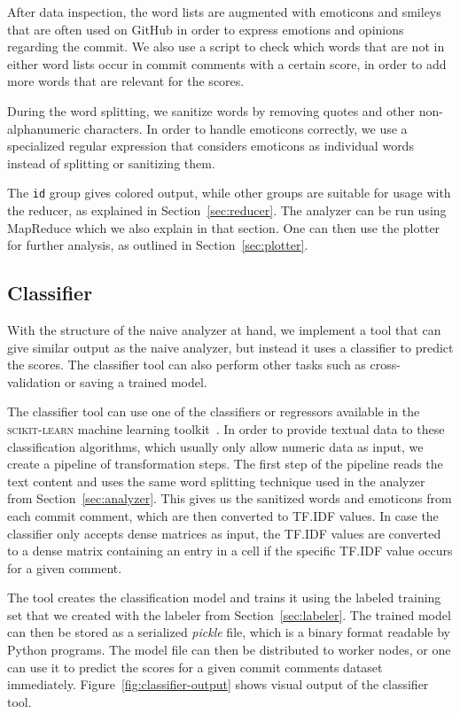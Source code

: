 \documentclass{article}
\begin{document}
After data inspection, the word lists are augmented with emoticons and smileys 
that are often used on GitHub in order to express emotions and opinions 
regarding the commit. We also use a script to check which words that are not 
in either word lists occur in commit comments with a certain score, in order to 
add more words that are relevant for the scores.

During the word splitting, we sanitize words by removing quotes and other 
non-alphanumeric characters. In order to handle emoticons correctly, we use 
a specialized regular expression that considers emoticons as individual words 
instead of splitting or sanitizing them.

The {\tt id} group gives colored output, while other groups are suitable for 
usage with the reducer, as explained in Section~\ref{sec:reducer}. The analyzer
can be run using MapReduce which we also explain in that section. One can then
use the plotter for further analysis, as outlined in Section~\ref{sec:plotter}.

\subsection{Classifier}\label{sec:classifier}
With the structure of the naive analyzer at hand, we implement a tool that can 
give similar output as the naive analyzer, but instead it uses a classifier to
predict the scores. The classifier tool can also perform other tasks such as 
cross-validation or saving a trained model.

The classifier tool can use one of the classifiers or regressors available in
the \textsc{scikit-learn} machine learning toolkit~\cite{pedgregosa2011scikit}.
In order to provide textual data to these classification algorithms, which
usually only allow numeric data as input, we create a pipeline of transformation
steps. The first step of the pipeline reads the text content and uses the same
word splitting technique used in the analyzer from Section~\ref{sec:analyzer}.
This gives us the sanitized words and emoticons from each commit comment, which
are then converted to TF.IDF values. In case the classifier only accepts dense 
matrices as input, the TF.IDF values are converted to a dense matrix containing 
an entry in a cell if the specific TF.IDF value occurs for a given comment.

The tool creates the classification model and trains it using the labeled 
training set that we created with the labeler from Section~\ref{sec:labeler}. 
The trained model can then be stored as a serialized \emph{pickle} file, which 
is a binary format readable by Python programs. The model file can then be 
distributed to worker nodes, or one can use it to predict the scores for 
a given commit comments dataset immediately. Figure~\ref{fig:classifier-output}
shows visual output of the classifier tool.
\end{document}
